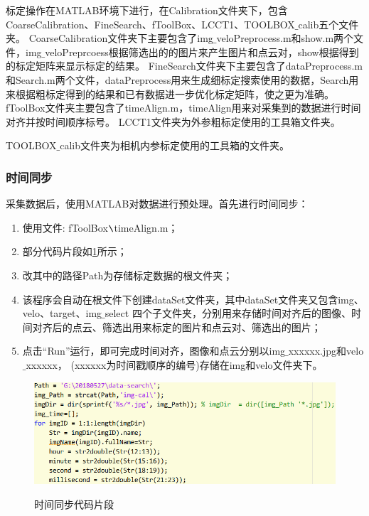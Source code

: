 标定操作在MATLAB环境下进行，在Calibration文件夹下，包含CoarseCalibration、FineSearch、fToolBox、LCCT1、TOOLBOX$\_$calib五个文件夹。
CoarseCalibration文件夹下主要包含了img$\_$veloPreprocess.m和show.m两个文件，img$\_$veloPreprcoess根据筛选出的的图片来产生图片和点云对，show根据得到的标定矩阵来显示标定的结果。
FineSearch文件夹下主要包含了dataPreprocess.m和Search.m两个文件，dataPreprocess用来生成细标定搜索使用的数据，Search用来根据粗标定得到的结果和已有数据进一步优化标定矩阵，使之更为准确。
fToolBox文件夹主要包含了timeAlign.m，timeAlign用来对采集到的数据进行时间对齐并按时间顺序标号。
LCCT1文件夹为外参粗标定使用的工具箱文件夹。


TOOLBOX$\_$calib文件夹为相机内参标定使用的工具箱的文件夹。




\subsubsection{时间同步}
采集数据后，使用MATLAB对数据进行预处理。首先进行时间同步：

\begin{enumerate}[$\star$]%
\item 使用文件: fToolBox$\verb|\|$timeAlign.m；
\item 部分代码片段如\figurename\ref{fig: timeAlign}所示；
\item 改其中的路径Path为存储标定数据的根文件夹；
\item 该程序会自动在根文件下创建dataSet文件夹，其中dataSet文件夹又包含img、velo、target、img$\_$select
四个子文件夹，分别用来存储时间对齐后的图像、时间对齐后的点云、筛选出用来标定的图片和点云对、筛选出的图片；
\item 点击“Run”运行，即可完成时间对齐，图像和点云分别以img$\_$xxxxxx.jpg和velo$\_$xxxxxx，
(xxxxxx为时间戳顺序的编号)存储在img和velo文件夹下。
\end{enumerate}

\begin{figure}[htbp]
	\centering
    \includegraphics[width=12cm]{pic/TAL.png} \\
	\caption{时间同步代码片段}\label{fig: timeAlign}
\end{figure}

